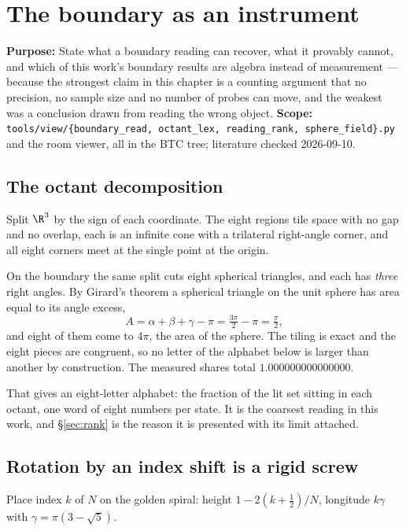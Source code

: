 \chapter{The boundary as an instrument}

\textbf{Purpose:} State what a boundary reading can recover, what it provably cannot, and which of this work's boundary results are algebra instead of measurement --- because the strongest claim in this chapter is a counting argument that no precision, no sample size and no number of probes can move, and the weakest was a conclusion drawn from reading the wrong object. \textbf{Scope:} \texttt{tools/\allowbreak{}view/\allowbreak{}\{boundary\_read, octant\_lex, reading\_rank, sphere\_field\}.py} and the room viewer, all in the BTC tree; literature checked 2026-09-10.

\section{The octant decomposition}

Split \(\R^3\) by the sign of each coordinate. The eight regions tile space with no gap and no overlap, each is an infinite cone with a trilateral right-angle corner, and all eight corners meet at the single point at the origin.

On the boundary the same split cuts eight spherical triangles, and each has \emph{three} right angles. By Girard's theorem a spherical triangle on the unit sphere has area equal to its angle excess,
\[
  A = \alpha + \beta + \gamma - \pi = \tfrac{3\pi}{2} - \pi = \tfrac{\pi}{2},
\]
and eight of them come to \(4\pi\), the area of the sphere. The tiling is exact and the eight pieces are congruent, so no letter of the alphabet below is larger than another by construction. The measured shares total \(1.000000000000000\).

That gives an eight-letter alphabet: the fraction of the lit set sitting in each octant, one word of eight numbers per state. It is the coarsest reading in this work, and \S\ref{sec:rank} is the reason it is presented with its limit attached.

\section{Rotation by an index shift is a rigid screw}

Place index \(k\) of \(N\) on the golden spiral: height \(1 - 2(k + \tfrac12)/N\), longitude \(k\gamma\) with \(\gamma = \pi(3 - \sqrt5)\).

